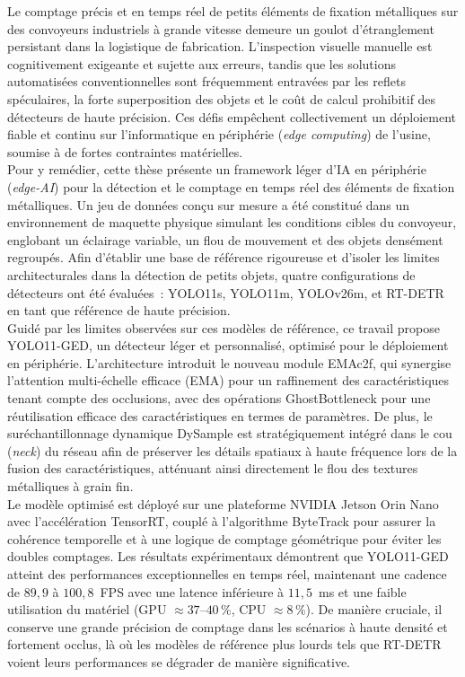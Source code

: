 Le comptage précis et en temps réel de petits éléments de fixation métalliques sur des convoyeurs industriels à grande vitesse demeure un goulot d'étranglement persistant dans la logistique de fabrication. L'inspection visuelle manuelle est cognitivement exigeante et sujette aux erreurs, tandis que les solutions automatisées conventionnelles sont fréquemment entravées par les reflets spéculaires, la forte superposition des objets et le coût de calcul prohibitif des détecteurs de haute précision. Ces défis empêchent collectivement un déploiement fiable et continu sur l'informatique en périphérie (\textit{edge computing}) de l'usine, soumise à de fortes contraintes matérielles.\\

Pour y remédier, cette thèse présente un framework léger d'IA en périphérie (\textit{edge-AI}) pour la détection et le comptage en temps réel des éléments de fixation métalliques. Un jeu de données conçu sur mesure a été constitué dans un environnement de maquette physique simulant les conditions cibles du convoyeur, englobant un éclairage variable, un flou de mouvement et des objets densément regroupés. Afin d'établir une base de référence rigoureuse et d'isoler les limites architecturales dans la détection de petits objets, quatre configurations de détecteurs ont été évaluées~: YOLO11s, YOLO11m, YOLOv26m, et RT-DETR en tant que référence de haute précision.\\

Guidé par les limites observées sur ces modèles de référence, ce travail propose YOLO11-GED, un détecteur léger et personnalisé, optimisé pour le déploiement en périphérie. L'architecture introduit le nouveau module EMAc2f, qui synergise l'attention multi-échelle efficace (EMA) pour un raffinement des caractéristiques tenant compte des occlusions, avec des opérations GhostBottleneck pour une réutilisation efficace des caractéristiques en termes de paramètres. De plus, le suréchantillonnage dynamique DySample est stratégiquement intégré dans le cou (\textit{neck}) du réseau afin de préserver les détails spatiaux à haute fréquence lors de la fusion des caractéristiques, atténuant ainsi directement le flou des textures métalliques à grain fin.\\

Le modèle optimisé est déployé sur une plateforme NVIDIA Jetson Orin Nano avec l'accélération TensorRT, couplé à l'algorithme ByteTrack pour assurer la cohérence temporelle et à une logique de comptage géométrique pour éviter les doubles comptages. Les résultats expérimentaux démontrent que YOLO11-GED atteint des performances exceptionnelles en temps réel, maintenant une cadence de $89,9$ à $100,8$~FPS avec une latence inférieure à $11,5$~ms et une faible utilisation du matériel (GPU $\approx 37$--$40\,\%$, CPU $\approx 8\,\%$). De manière cruciale, il conserve une grande précision de comptage dans les scénarios à haute densité et fortement occlus, là où les modèles de référence plus lourds tels que RT-DETR voient leurs performances se dégrader de manière significative.\\

